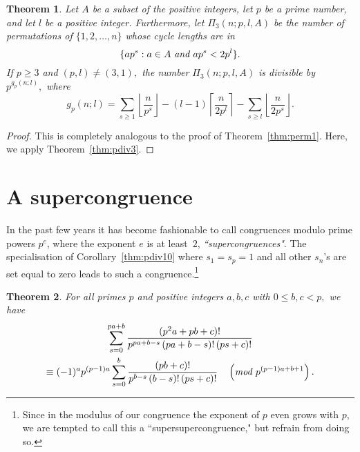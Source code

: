\documentclass[12pt,reqno]{amsart}
\numberwithin{equation}{section}
\newtheorem{theorem}{Theorem}
\theoremstyle{remark}
\begin{document}
\begin{theorem} \label{thm:perm3}
Let\/ $A$ be a subset of the positive integers, 
let $p$ be a prime number, and let $l$ be
a positive integer.
Furthermore, let $\Pi_3(n;p,l,A)$ be the number of permutations
of $\{1,2,\dots,n\}$
whose cycle lengths are in 
\begin{equation} \label{eq:PiA3} 
\{ap^s:a\in A\text{ \em and }ap^s< 2p^l\}.
\end{equation}
If $p\ge3$ and $(p,l)\ne(3,1),$ the number
$\Pi_3(n;p,l,A)$ is divisible by $p^{g_p(n;l)},$ where
$$
g_p(n;l)=
\sum_{s\ge1}{\left\lfloor{\frac {n} {p^{s}}}\right\rfloor}
-(l-1){\left\lceil{\frac {n} {2p^l}}\right\rceil}-\sum_{s \ge l}{\left\lfloor{\frac {n} {2p^{s}}}\right\rfloor} .
$$
\end{theorem}

\begin{proof}
This is completely analogous to the proof of Theorem~\ref{thm:perm1}.
Here, we apply Theorem~\ref{thm:pdiv3}.
\end{proof}

\section{A supercongruence}
\label{sec:super}

In the past few years it has become fashionable to call congruences
modulo prime powers $p^e$, where the exponent $e$ is at least~$2$,
{\it``supercongruences"}. The specialisation of
Corollary~\ref{thm:pdiv10} where $s_1=s_p=1$ and all other $s_n$'s
are set equal to zero leads to such a congruence.\footnote{Since
in the modulus of our congruence the exponent of $p$ even grows
with $p$, we are tempted to call this a ``supersupercongruence,"
but refrain from doing so.}

\begin{theorem} \label{eq:p-id}
For all primes $p$ and positive integers $a,b,c$
with $0\le b,c<p,$ we have
\begin{multline} \label{eq:idpm}
\sum_{s=0}^{pa+b} 
\frac {(p^2a+pb+c)!} {p^{pa+b - s}\left(pa+b - s\right)!\,(p s+c)!}\\
\equiv (-1)^ap^{(p-1)a}
\sum_{s=0}^{b} 
\frac {(pb+c)!} {p^{b - s}\left(b - s\right)!\,(p s+c)!}
\quad 
\left(\text{\em mod $p^{(p-1)a+b+1}$}\right).
\end{multline}
\end{theorem}
\end{document}
